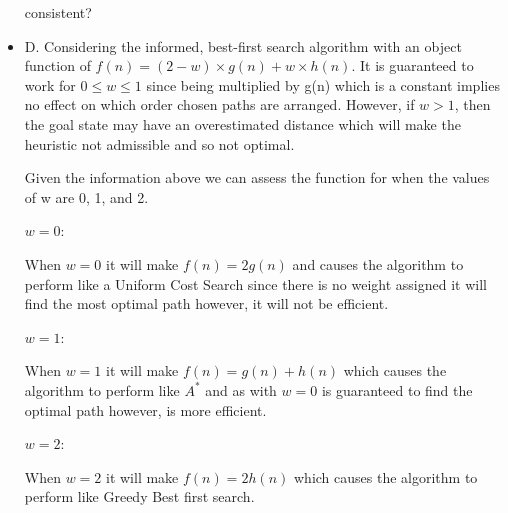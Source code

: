 \documentclass[10pt,a4paper]{article}
\begin{document}
\begin{itemize}
			
			consistent? 
			
		
		
		\item
		D. Considering the informed, best-first search algorithm with an object function of $f(n) = (2-w) \times g(n) + w \times h(n)$. It is guaranteed to work for $0 \leq w \leq 1$ since being multiplied by g(n) which is a constant implies no effect on which order chosen paths are arranged. However, if $w > 1$, then the goal state may have an overestimated distance which will make the heuristic not admissible and so not optimal.
		
		Given the information above we can assess the function for when the values of w are 0, 1, and 2.
		
		$w = 0$:
		
		When $w = 0$ it will make $f(n) = 2g(n)$ and causes the algorithm to perform like a Uniform Cost Search since there is no weight assigned it will find the most optimal path however, it will not be efficient.
		
		$w = 1$:

		When $w = 1$ it will make $f(n) = g(n) + h(n)$ which causes the algorithm to perform like $A^*$ and as with $w=0$ is guaranteed to find the optimal path however, is more efficient.
		
		$w = 2$: 
		
		When $w = 2$ it will make $f(n) = 2h(n)$ which causes the algorithm to perform like Greedy Best first search.
		
	\end{itemize}
		
\end{document}
